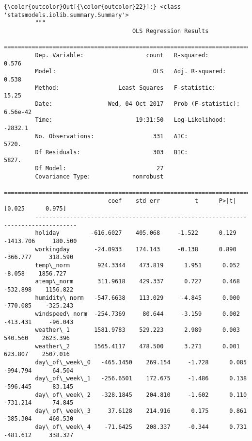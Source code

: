 \documentclass[11pt]{article}
\begin{document}
\begin{Verbatim}[commandchars=\\\{\}]
{\color{outcolor}Out[{\color{outcolor}22}]:} <class 'statsmodels.iolib.summary.Summary'>
         """
                                     OLS Regression Results                            
         ==============================================================================
         Dep. Variable:                  count   R-squared:                       0.576
         Model:                            OLS   Adj. R-squared:                  0.538
         Method:                 Least Squares   F-statistic:                     15.25
         Date:                Wed, 04 Oct 2017   Prob (F-statistic):           6.56e-42
         Time:                        19:31:50   Log-Likelihood:                -2832.1
         No. Observations:                 331   AIC:                             5720.
         Df Residuals:                     303   BIC:                             5827.
         Df Model:                          27                                         
         Covariance Type:            nonrobust                                         
         ==================================================================================
                              coef    std err          t      P>|t|      [0.025      0.975]
         ----------------------------------------------------------------------------------
         holiday         -616.6027    405.068     -1.522      0.129   -1413.706     180.500
         workingday       -24.0933    174.143     -0.138      0.890    -366.777     318.590
         temp\_norm        924.3344    473.819      1.951      0.052      -8.058    1856.727
         atemp\_norm       311.9618    429.337      0.727      0.468    -532.898    1156.822
         humidity\_norm   -547.6638    113.029     -4.845      0.000    -770.085    -325.243
         windspeed\_norm  -254.7369     80.644     -3.159      0.002    -413.431     -96.043
         weather\_1       1581.9783    529.223      2.989      0.003     540.560    2623.396
         weather\_2       1565.4117    478.500      3.271      0.001     623.807    2507.016
         day\_of\_week\_0   -465.1450    269.154     -1.728      0.085    -994.794      64.504
         day\_of\_week\_1   -256.6501    172.675     -1.486      0.138    -596.445      83.145
         day\_of\_week\_2   -328.1845    204.810     -1.602      0.110    -731.214      74.845
         day\_of\_week\_3     37.6128    214.916      0.175      0.861    -385.304     460.530
         day\_of\_week\_4    -71.6425    208.337     -0.344      0.731    -481.612     338.327

\end{Verbatim}
\end{document}
